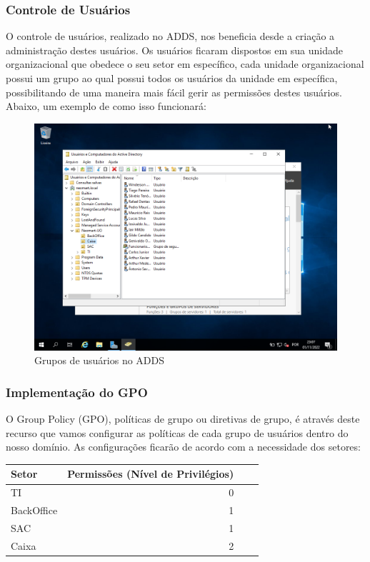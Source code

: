 \documentclass[12pt]{article}
\begin{document}
\subsubsection{Controle de Usuários}
O controle de usuários, realizado no ADDS, nos beneficia desde a criação a administração destes usuários. Os usuários ficaram dispostos em sua unidade organizacional que obedece o seu setor em específico, cada unidade organizacional possui um grupo ao qual possui todos os usuários da unidade em específica, possibilitando de uma maneira mais fácil gerir as permissões destes usuários. Abaixo, um exemplo de como isso funcionará:

\begin{figure}[ht]
\centering
\includegraphics[height=0.5\textwidth]{adds-unidades-usuarios.png}
\caption{Grupos de usuários no ADDS}
\label{fig:adds-pastas}
\end{figure}

\subsubsection{Implementação do GPO}
O Group Policy (GPO), políticas de grupo ou diretivas de grupo, é através deste recurso que vamos configurar as políticas de cada grupo de usuários dentro do nosso domínio. As configurações ficarão de acordo com a necessidade dos setores:

\begin{center}
\begin{tabular}{| l | r | r | r |}
\hline
Setor & Permissões (Nível de Privilégios)\\
\hline
TI & 0\\
BackOffice & 1\\
SAC & 1\\
Caixa & 2\\ 
\hline
\end{tabular}
\end{center}
\end{document}
